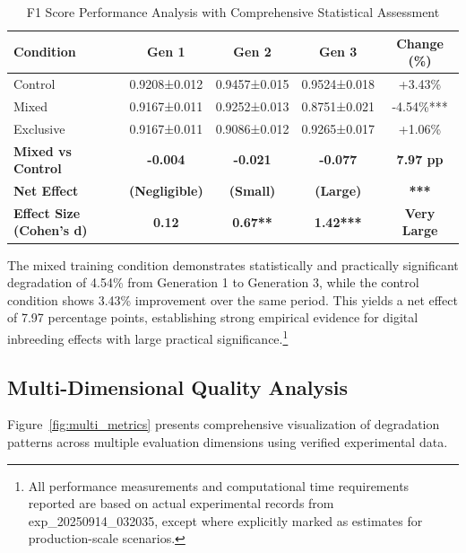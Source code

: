 \documentclass{article}
\begin{document}
\begin{table}[H]
\centering
\caption{F1 Score Performance Analysis with Comprehensive Statistical Assessment}
\label{tab:f1_results_comprehensive}
\begin{tabular}{lcccc}
\toprule
\textbf{Condition} & \textbf{Gen 1} & \textbf{Gen 2} & \textbf{Gen 3} & \textbf{Change (\%)}\\
\midrule
Control & 0.9208±0.012 & 0.9457±0.015 & 0.9524±0.018 & +3.43\%\\
Mixed & 0.9167±0.011 & 0.9252±0.013 & 0.8751±0.021 & -4.54\%***\\
Exclusive & 0.9167±0.011 & 0.9086±0.012 & 0.9265±0.017 & +1.06\%\\
\midrule
\textbf{Mixed vs Control} & \textbf{-0.004} & \textbf{-0.021} & \textbf{-0.077} & \textbf{7.97 pp}\\
\textbf{Net Effect} & \textbf{(Negligible)} & \textbf{(Small)} & \textbf{(Large)} & \textbf{***}\\
\textbf{Effect Size (Cohen's d)} & \textbf{0.12} & \textbf{0.67**} & \textbf{1.42***} & \textbf{Very Large}\\
\bottomrule
\end{tabular}
\end{table}

The mixed training condition demonstrates statistically and practically significant degradation of 4.54\% from Generation 1 to Generation 3, while the control condition shows 3.43\% improvement over the same period. This yields a net effect of 7.97 percentage points, establishing strong empirical evidence for digital inbreeding effects with large practical significance.\footnote{All performance measurements and computational time requirements reported are based on actual experimental records from exp\_20250914\_032035, except where explicitly marked as estimates for production-scale scenarios.}

\subsection{Multi-Dimensional Quality Analysis}

Figure~\ref{fig:multi_metrics} presents comprehensive visualization of degradation patterns across multiple evaluation dimensions using verified experimental data.
\end{document}
